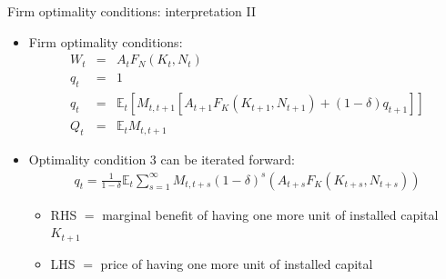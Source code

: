 \documentclass[9pt,xcolor={dvipsnames}]{beamer}
\newcommand{\bit}{\begin{itemize}}
\newcommand{\eit}{\end{itemize}}
\begin{document}
\begin{frame}{Firm optimality conditions: interpretation II}

\bit
\setlength\itemsep{2em} 

\item Firm optimality conditions:
\begin{eqnarray}
W_t &=& A_t F_N(K_t, N_t) \nonumber \\
q_t &=& 1 \nonumber \\
q_t &=&  \mathbb E_t \left[M_{t,t+1}\left[A_{t+1}F_K(K_{t+1}, N_{t+1}) + (1-\delta)q_{t+1} \right] \right] \nonumber \\
Q_t &=& \mathbb E_t M_{t,t+1} \nonumber
\end{eqnarray}

\item Optimality condition 3 can be iterated forward:
\begin{eqnarray}
q_t = \frac{1}{1-\delta} \mathbb E_t \sum_{s=1}^{\infty} M_{t,t+s}(1-\delta)^s \left(A_{t+s}F_K(K_{t+s}, N_{t+s})\right) \nonumber
\end{eqnarray}
\bit
\setlength\itemsep{0.5em} 
\item RHS $=$ marginal benefit of having one more unit of installed capital $K_{t+1}$

\item LHS $=$ price of having one more unit of installed capital
\eit

\eit

\end{frame}
\end{document}
